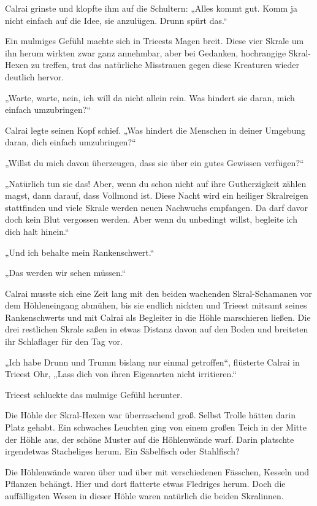 Calrai grinste und klopfte ihm auf die Schultern: „Alles kommt gut. Komm ja nicht einfach auf die Idee, sie anzulügen. Drunn spürt das.“

Ein mulmiges Gefühl machte sich in Trieests Magen breit. Diese vier Skrale um ihn herum wirkten zwar ganz annehmbar, aber bei Gedanken, hochrangige Skral-Hexen zu treffen, trat das natürliche Misstrauen gegen diese Kreaturen wieder deutlich hervor.

„Warte, warte, nein, ich will da nicht allein rein. Was hindert sie daran, mich einfach umzubringen?“

Calrai legte seinen Kopf schief. „Was hindert die Menschen in deiner Umgebung daran, dich einfach umzubringen?“

„Willst du mich davon überzeugen, dass sie über ein gutes Gewissen verfügen?“

„Natürlich tun sie das! Aber, wenn du schon nicht auf ihre Gutherzigkeit zählen magst, dann darauf, dass Vollmond ist. Diese Nacht wird ein heiliger Skralreigen stattfinden und viele Skrale werden neuen Nachwuchs empfangen. Da darf davor doch kein Blut vergossen werden. Aber wenn du unbedingt willst, begleite ich dich halt hinein.“

„Und ich behalte mein Rankenschwert.“

„Das werden wir sehen müssen.“

Calrai musste sich eine Zeit lang mit den beiden wachenden Skral-Schamanen vor dem Höhleneingang abmühen, bis sie endlich nickten und Trieest mitsamt seines Rankenschwerts und mit Calrai als Begleiter in die Höhle marschieren ließen. Die drei restlichen Skrale saßen in etwas Distanz davon auf den Boden und breiteten ihr Schlaflager für den Tag vor.

„Ich habe Drunn und Trumm bislang nur einmal getroffen“, flüsterte Calrai in Trieest Ohr, „Lass dich von ihren Eigenarten nicht irritieren.“

Trieest schluckte das mulmige Gefühl herunter.\bigskip







Die Höhle der Skral-Hexen war überraschend groß. Selbst Trolle hätten darin Platz gehabt. Ein schwaches Leuchten ging von einem großen Teich in der Mitte der Höhle aus, der schöne Muster auf die Höhlenwände warf. Darin platschte irgendetwas Stacheliges herum. Ein Säbelfisch oder Stahlfisch?

Die Höhlenwände waren über und über mit verschiedenen Fässchen, Kesseln und Pflanzen behängt. Hier und dort flatterte etwas Fledriges herum. Doch die auffälligsten Wesen in dieser Höhle waren natürlich die beiden Skralinnen.

